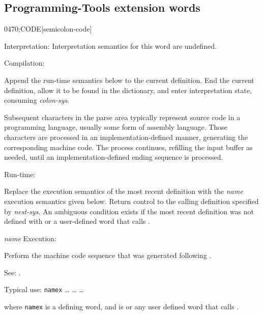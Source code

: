 \subsection{Programming-Tools extension words} %
\extended


\begin{newword*}{0470}{;CODE}[semicolon-code]
\item[Interpretation:]
	Interpretation semantics for this word are undefined.

\item[Compilation:]

	Append the run-time semantics below to the current definition.
	End the current definition, allow it to be found in the
	dictionary, and enter interpretation state, consuming
	\emph{colon-sys}.

	Subsequent characters in the parse area typically represent
	source code in a programming language, usually some form of
	assembly language. Those characters are processed in an
	implementation-defined manner, generating the corresponding
	machine code. The process continues, refilling the input buffer
	as needed, until an implementation-defined ending sequence is
	processed.

\item[Run-time:]
	\stack{}{}

	Replace the execution semantics of the most recent definition
	with the \emph{name} execution semantics given below. Return
	control to the calling definition specified by \emph{nest-sys}.
	An ambiguous condition exists if the most recent definition was
	not defined with  or a user-defined word that
	calls .

\item[\emph{name} Execution:]

	Perform the machine code sequence that was generated following
	.

\item[See:]
	.

	\begin{rationale} %
		Typical use:
		\word[core]{:} \texttt{namex}
			{\ldots}  {\ldots}
		 {\ldots}

		where \texttt{namex} is a defining word, and  is
		 or any user defined word that calls
		.
	\end{rationale}
\end{newword*}


